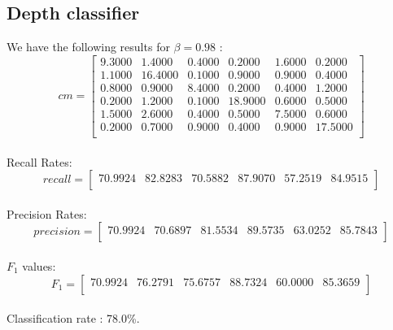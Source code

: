 \documentclass[a4paper,12pt,oneside,final]{report}
\begin{document}
\begin{appendices}
\subsection{Depth classifier}
We have the following results for $\beta=0.98$ :
\[
cm = \left[\begin{array}{cccccc}
    9.3000  &  1.4000  &  0.4000  &  0.2000  &  1.6000  &  0.2000 \\
    1.1000  & 16.4000  &  0.1000  &  0.9000  &  0.9000  &  0.4000 \\
    0.8000  &  0.9000  &  8.4000  &  0.2000  &  0.4000  &  1.2000 \\
    0.2000  &  1.2000  &  0.1000  & 18.9000  &  0.6000  &  0.5000 \\
    1.5000  &  2.6000  &  0.4000  &  0.5000  &  7.5000  &  0.6000 \\
    0.2000  &  0.7000  &  0.9000  &  0.4000  &  0.9000  & 17.5000 \\
\end{array}
\right]
\]
\paragraph{}
Recall Rates:
\[
recall = \left[\begin{array}{cccccc}
70.9924 &  82.8283  & 70.5882 &  87.9070 &  57.2519  & 84.9515\\
\end{array}
\right]
\]
\paragraph{}
Precision Rates:
\[
precision = \left[\begin{array}{cccccc}
70.9924 &  70.6897  & 81.5534  & 89.5735 &  63.0252 &  85.7843 \\
\end{array}
\right]
\]
\paragraph{}
$F_{1}$ values: 
\[
F_{1} = \left[\begin{array}{cccccc}
 70.9924  & 76.2791 &  75.6757  & 88.7324  & 60.0000  & 85.3659\\
\end{array}
\right]
\]
\paragraph{}
Classification rate : 78.0\%.

\end{appendices}
\end{document}
